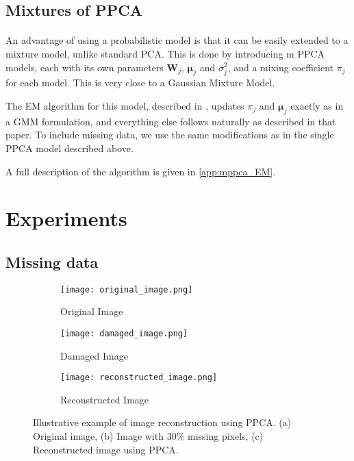\documentclass{article}
\begin{document}
\subsection{Mixtures of PPCA}
\label{sec:mppca}

\paragraph{} An advantage of using a probabilistic model is that it can be easily extended to a mixture model, unlike standard PCA. This is done by introducing m PPCA models, each with its own parameters $\mathbf{W}_j$, $\boldsymbol{\mu}_j$ and $\sigma^2_j$, and a mixing coefficient $\pi_j$ for each model. This is very close to a Gaussian Mixture Model.

The EM algorithm for this model, described in \citet{MPPCA}, updates $\pi_j$ and $\boldsymbol{\mu}_j$ exactly as in a GMM formulation, and everything else follows naturally as described in that paper. To include missing data, we use the same modifications as in the single PPCA model described above.

A full description of the algorithm is given in \ref{app:mppca_EM}.

\section{Experiments}

\subsection{Missing data}

\begin{figure}[H]
    \centering
    \begin{subfigure}[b]{0.3\textwidth}
        \centering
        \texttt{[image: original\_image.png]}
        \caption{Original Image}
        \label{fig:original_image}
    \end{subfigure}
    \hfill
    \begin{subfigure}[b]{0.3\textwidth}
        \centering
        \texttt{[image: damaged\_image.png]}
        \caption{Damaged Image}
        \label{fig:damaged_image}
    \end{subfigure}
    \hfill
    \begin{subfigure}[b]{0.3\textwidth}
        \centering
        \texttt{[image: reconstructed\_image.png]}
        \caption{Reconstructed Image}
        \label{fig:reconstructed_image}
    \end{subfigure}
    \caption{Illustrative example of image reconstruction using PPCA. (a) Original image, (b) Image with 30\% missing pixels, (c) Reconstructed image using PPCA.}
    \label{fig:mnist_reconstruction}
\end{figure}
\end{document}
